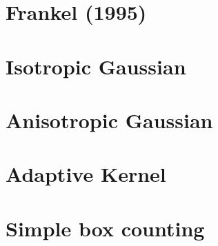 \section{Frankel (1995)}

\section{Isotropic Gaussian}

\section{Anisotropic Gaussian}

\section{Adaptive Kernel}

\section{Simple box counting}
